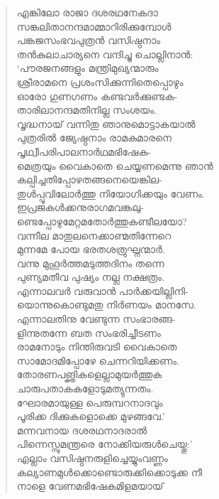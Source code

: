 \begin{verse}
എങ്കിലോ രാജാ ദശരഥനേകദാ\\
സങ്കലിതാനന്ദമാമ്മാറിരിക്കുമ്പോള്‍\\
പങ്കജസംഭവപുത്രന്‍ വസിഷ്ഠനാം\\
തന്‍കുലാചാര്യനെ വന്ദിച്ചു ചൊല്ലിനാന്‍:\\
‘പൗരജനങ്ങളും മന്ത്രിമുഖ്യന്മാരും\\
ശ്രീരാമനെ പ്രശംസിക്കുന്നിതെപ്പൊഴും\\
ഓരോ ഗുണഗണം കണ്ടവര്‍ക്കുണ്ടക-\\
താരിലാനന്ദമതിനില്ല സംശയം.\\
വൃദ്ധനായ് വന്നിതു ഞാനുമൊട്ടാകയാല്‍\\
പുത്രരില്‍ ജ്യേഷ്ഠനാം രാമകുമാരനെ\\
പൃഥ്വീപരിപാലനാര്‍ഥമഭിഷേക-\\
മെത്രയും വൈകാതെ ചെയ്യണമെന്നു ഞാന്‍\\
കല്പിച്ചതിപ്പോഴതങ്ങനെയെങ്കില-\\
തുള്‍പ്പൂവിലോര്‍ത്തു നിയോഗിക്കയും വേണം.\\
ഇപ്രജകള്‍ക്കനുരാഗമവങ്കലു-\\
ണ്ടെപ്പോഴുമേറ്റമതോര്‍ത്തുകണ്ടീലയോ?\\
വന്നീല മാതുലനെക്കാണ്മതിന്നേറെ\\
മുന്നമേ പോയ ഭരതശത്രുഘ്നന്മാര്‍.\\
വന്നു മുഹൂര്‍ത്തമടുത്തദിനം തന്നെ\\
പുണ്യമതീവ പുഷ്യം നല്ല നക്ഷത്രം.\\
എന്നാലവര്‍ വരുവാന്‍ പാര്‍ക്കയില്ലിനി-\\
യൊന്നുകൊണ്ടുമതു നിര്‍ണയം മാനസേ.\\
എന്നാലതിനു വേണ്ടുന്ന സംഭാരങ്ങ-\\
ളിന്നുതന്നേ ബത സംഭരിച്ചീടണം\\
രാമനോടും നിന്തിരുവടി വൈകാതെ\\
സാമോദമിപ്പോഴേ ചെന്നറിയിക്കണം.\\
തോരണപങ്ക്തികളെല്ലാമുയര്‍ത്തുക\\
ചാരുപതാകകളോടുമത്യുന്നതം.\\
ഘോരമായുള്ള പെരുമ്പറനാദവും\\
പൂരിക്ക ദിക്കുകളൊക്കെ മുഴങ്ങവേ.’\\
മന്നവനായ ദശരഥനാദരാല്‍\\
പിന്നെസ്സുമന്ത്രരെ നോക്കിയരുള്‍ചെയ്തു:’\\
എല്ലാം വസിഷ്ഠനരുളിച്ചെയ്യുംവണ്ണം\\
കല്യാണമുള്‍ക്കൊണ്ടൊരുക്കിക്കൊടുക്ക നീ\\
നാളെ വേണമഭിഷേകമിളമയായ്\\

\end{verse}
